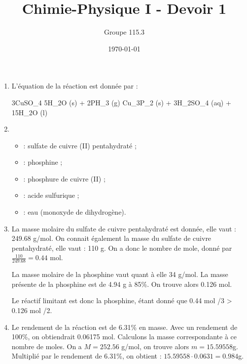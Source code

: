 \documentclass{article}
\title{Chimie-Physique I - Devoir 1}
\author{Groupe 115.3}
\date{\today}
\begin{document}
\maketitle

\begin{enumerate}
	\item 
		L'\'equation de la r\'eaction est donn\'ee par :
		\begin{chemmath}
			3CuSO_4 \cdot 5H_2O (s) + 2PH_3 (g) \longrightarrow Cu_3P_2 (s) + 3H_2SO_4 (aq) + 15H_2O (l)
		\end{chemmath}
	\item 
		\begin{itemize}
			\item {} : sulfate de cuivre (II) pentahydrat\'e ;
			\item {} : phosphine ;
			\item {} : phosphure de cuivre (II) ;
			\item {} : acide sulfurique ;
			\item {} : eau (monoxyde de dihydrog\`ene).
		\end{itemize}
	\item
		La masse molaire du sulfate de cuivre pentahydrat\'e est donn\'ee, elle vaut : 249.68 g/mol. On connait 			\'egalement la masse du sulfate de cuivre pentahydrat\'e, elle vaut : 110 g. On a donc le nombre de mole, donn\'e par $\frac{110}{249.68} = 0.44$ mol.
		
		La masse molaire de la phosphine vaut quant \`a elle 34 g/mol. La masse pr\'esente de la phosphine est de 4.94 g \`a 85\%. On trouve alors 0.126 mol.
		
		Le r\'eactif limitant est donc la phosphine, \'etant donn\'e que 0.44 mol /3 > 0.126 mol /2. 
		
	\item
		Le rendement de la r\'eaction est de 6.31\% en masse. Avec un rendement de 100\%, on obtiendrait 0.06175 mol. Calculons la masse correspondante à ce nombre de moles. On a $M = 252.56$ g/mol, on trouve alors $m = 15.59558$g. Multipli\'e par le rendement de 6.31\%, on obtient : $15.59558 \cdot 0.0631 = 0.984$g.
\end{enumerate}
\end{document}
